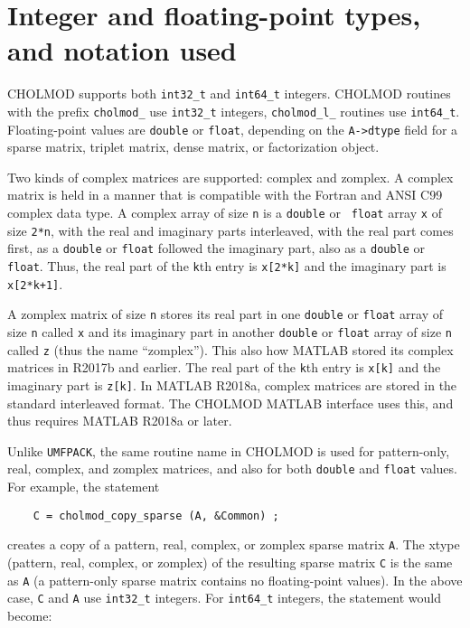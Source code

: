 \documentclass[11pt]{article}
\begin{document}
\newpage \section{Integer and floating-point types, and notation used}

CHOLMOD supports both {\tt int32\_t} and {\tt int64\_t} integers.  CHOLMOD
routines with the prefix {\tt cholmod\_} use {\tt int32\_t} integers,
{\tt cholmod\_l\_} routines use {\tt int64\_t}.  Floating-point
values are {\tt double} or {\tt float}, depending on the {\tt A->dtype}
field for a sparse matrix, triplet matrix, dense matrix, or factorization
object.

Two kinds of complex matrices are supported: complex and zomplex.  A complex
matrix is held in a manner that is compatible with the Fortran and ANSI C99
complex data type.  A complex array of size {\tt n} is a {\tt double} or {\tt
float} array {\tt x} of size {\tt 2*n}, with the real and imaginary parts
interleaved, with the real part comes first, as a {\tt double} or {\tt float}
followed the imaginary part, also as a {\tt double} or {\tt float}.  Thus, the
real part of the {\tt k}th entry is {\tt x[2*k]} and the imaginary part is {\tt
x[2*k+1]}.

A zomplex matrix of size {\tt n} stores its real part in one {\tt double} or
{\tt float} array of size {\tt n} called {\tt x} and its imaginary part in
another {\tt double} or {\tt float} array of size {\tt n} called {\tt z} (thus
the name ``zomplex'').  This also how MATLAB stored its complex matrices in
R2017b and earlier.  The real part of the {\tt k}th entry is {\tt x[k]} and the
imaginary part is {\tt z[k]}.  In MATLAB R2018a, complex matrices are stored
in the standard interleaved format.  The CHOLMOD MATLAB interface uses this,
and thus requires MATLAB R2018a or later.

Unlike {\tt UMFPACK}, the same routine name in CHOLMOD is used for
pattern-only, real, complex, and zomplex matrices, and also for both
{\tt double} and {\tt float} values.  For example, the statement

\begin{verbatim}
    C = cholmod_copy_sparse (A, &Common) ;
\end{verbatim}

creates a copy of a pattern, real, complex, or zomplex sparse matrix {\tt A}.
The xtype (pattern, real, complex, or zomplex) of the resulting sparse matrix
{\tt C} is the same as {\tt A} (a pattern-only sparse matrix contains no
floating-point values).  In the above case, {\tt C} and {\tt A} use {\tt int32\_t}
integers.  For {\tt int64\_t} integers, the statement would become:
\end{document}
